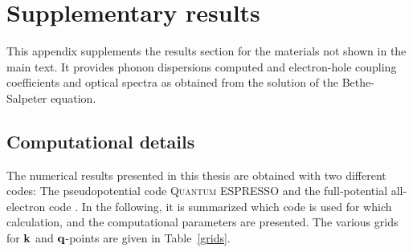 \phantom{I}
\vspace{3cm}
\section{Supplementary results}
This appendix supplements the results section for the materials not shown in the main text. It provides  phonon dispersions computed and electron-hole coupling coefficients and optical spectra as obtained from the solution of the Bethe-Salpeter equation. 


\subsection{Computational details}\label{app_comp_details}
The numerical results presented in this thesis are obtained with two different codes: The pseudopotential code \textsc{Q\!u\!a\!n\!t\!u\!m} ESPRESSO\cite{quantumespresso} and the full-potential all-electron code \exciting{}\cite{exciting}. In the following, it is summarized which code is used for which calculation, and the computational parameters are presented. The various grids for $\mathbf{k}$ and $\mathbf{q}$-points are given in Table~\ref{grids}. \par

